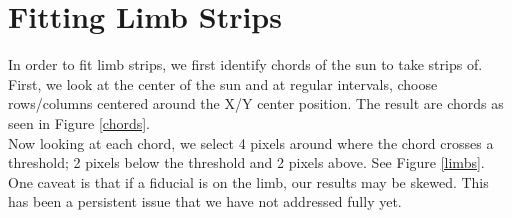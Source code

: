\documentclass[10pt]{scrartcl}
\begin{document}

\section{Fitting Limb Strips} %
\label{sec:fitting_limb_strips}

In order to fit limb strips, we first identify chords of the sun to take strips of. First, we look at the center of the sun and at regular intervals, choose rows/columns centered around the X/Y center position. The result are chords as seen in Figure \ref{chords}.\\
Now looking at each chord, we select 4 pixels around where the chord crosses a threshold; 2 pixels below the threshold and 2 pixels above. See Figure \ref{limbs}. One caveat is that if a fiducial is on the limb, our results may be skewed. This has been a persistent issue that we have not addressed fully yet.
\end{document}
